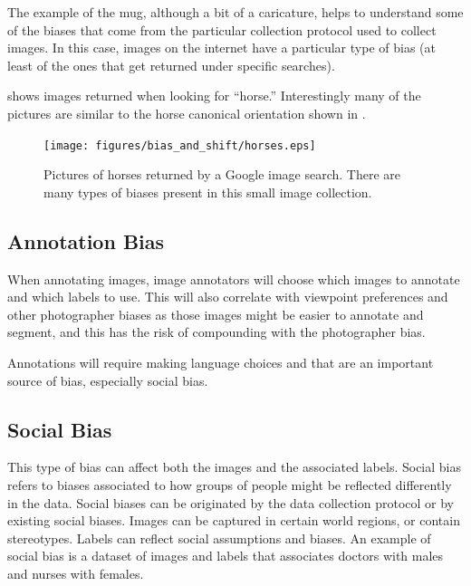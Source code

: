 The example of the mug, although a bit of a caricature, helps to understand some of the biases that come from the particular collection protocol used to collect images. In this case, images on the internet have a particular type of bias (at least of the ones that get returned under specific searches). 

\Fig{\ref{fig:bias_and_shift:horses}} shows images returned when looking for ``horse.'' Interestingly many of the pictures are similar to the horse canonical orientation shown in \fig{\ref{fig:bias_and_shift:palmer_1981enhanced}}.

\begin{figure}[h!]
    \centerline{
    \texttt{[image: figures/bias\_and\_shift/horses.eps]}
    }
    \caption{Pictures of horses returned by a Google image search. There are many types of biases present in this small image collection.}
    \label{fig:bias_and_shift:horses}
\end{figure}



\subsection{Annotation Bias}

When annotating images, image annotators will choose which images to annotate and which labels to use. This will also correlate with viewpoint preferences and other photographer biases as those images might be easier to annotate and segment, and this has the risk of compounding with the photographer bias. 

Annotations will require making language choices and that are an important source of bias, especially social bias.

\subsection{Social Bias}

This type of bias can affect both the images and the associated labels. Social bias refers to biases associated to how groups of people  might be reflected differently in the data. Social biases can be originated by the data collection protocol or by existing social biases.  Images can be captured in certain world regions, or contain stereotypes. Labels can reflect social assumptions and biases. An example of social bias is a dataset of images and labels that associates doctors with males and nurses with females.


